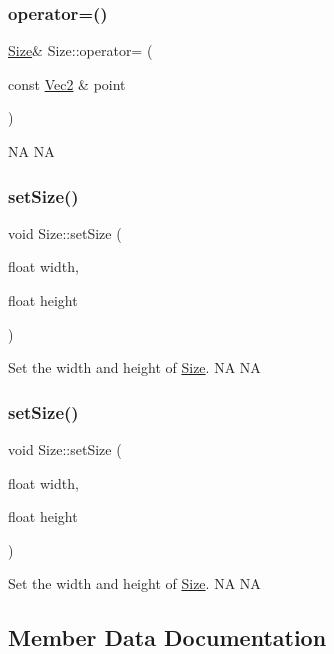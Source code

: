 \subsubsection{\texorpdfstring{operator=()}{operator=()}\hspace{0.1cm}{\footnotesize\ttfamily [4/4]}}
{\footnotesize\ttfamily \hyperlink{classSize}{Size}\& Size\+::operator= (\begin{DoxyParamCaption}\item[{const \hyperlink{classVec2}{Vec2} \&}]{point }\end{DoxyParamCaption})}

NA  NA \mbox{\label{classSize_a3aefde34596edaed033ec39a61891fca}} 
\subsubsection{\texorpdfstring{set\+Size()}{setSize()}\hspace{0.1cm}{\footnotesize\ttfamily [1/2]}}
{\footnotesize\ttfamily void Size\+::set\+Size (\begin{DoxyParamCaption}\item[{float}]{width,  }\item[{float}]{height }\end{DoxyParamCaption})}

Set the width and height of \hyperlink{classSize}{Size}.  NA  NA \mbox{\label{classSize_a3aefde34596edaed033ec39a61891fca}} 
\subsubsection{\texorpdfstring{set\+Size()}{setSize()}\hspace{0.1cm}{\footnotesize\ttfamily [2/2]}}
{\footnotesize\ttfamily void Size\+::set\+Size (\begin{DoxyParamCaption}\item[{float}]{width,  }\item[{float}]{height }\end{DoxyParamCaption})}

Set the width and height of \hyperlink{classSize}{Size}.  NA  NA 

\subsection{Member Data Documentation}
\mbox{\label{classSize_a880fa21eaad5a5a0fe439d440776fd05}} 
